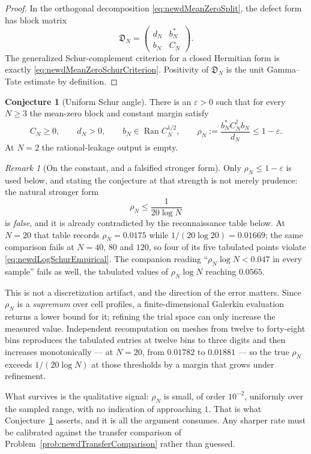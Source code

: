 \documentclass[11pt]{amsart}
\theoremstyle{definition}
\newtheorem{conjecture}[theorem]{Conjecture}
\theoremstyle{remark}
\newtheorem{remark}[theorem]{Remark}
\begin{document}
\begin{proof}
In the orthogonal decomposition \eqref{eq:newdMeanZeroSplit}, the defect
form has block matrix
\[
 \mathfrak D_N=
 \begin{pmatrix}d_N&b_N^*\\ b_N&C_N\end{pmatrix}.
\]
The generalized Schur-complement criterion for a closed Hermitian form is
exactly \eqref{eq:newdMeanZeroSchurCriterion}.  Positivity of
$\mathfrak D_N$ is the unit Gamma--Tate estimate by definition.
\end{proof}

\begin{conjecture}[Uniform Schur angle]
\label{conj:newdLogSchurAngle}
There is an $\varepsilon>0$ such that for every $N\geq3$ the mean-zero block
and constant margin satisfy
\begin{equation}\label{eq:newdLogSchurConjecture}
 C_N\geq0,
 \qquad d_N>0,
 \qquad b_N\in\operatorname{Ran}C_N^{1/2},
 \qquad
 \rho_N:=\frac{b_N^*C_N^\dagger b_N}{d_N}
 \leq1-\varepsilon .
\end{equation}
At $N=2$ the rational-leakage output is empty.
\end{conjecture}

\begin{remark}[On the constant, and a falsified stronger form]
\label{rem:newdConstantCalibration}
Only $\rho_N\le1-\varepsilon$ is used below, and stating the conjecture at
that strength is not merely prudence: the natural stronger form
\begin{equation}\label{eq:newdLogSchurEmpirical}
 \rho_N\le\frac{1}{20\log N}
\end{equation}
is \emph{false}, and it is already contradicted by the reconnaissance table
below.  At $N=20$ that table records $\rho_N=0.0175$ while
$1/(20\log20)=0.01669$; the same comparison fails at $N=40$, $80$ and $120$,
so four of its five tabulated points violate
\eqref{eq:newdLogSchurEmpirical}.  The companion reading
``$\rho_N\log N<0.047$ in every sample'' fails as well, the tabulated values
of $\rho_N\log N$ reaching $0.0565$.

This is not a discretization artifact, and the direction of the error matters.
Since $\rho_N$ is a \emph{supremum} over cell profiles, a finite-dimensional
Galerkin evaluation returns a lower bound for it; refining the trial space can
only increase the measured value.  Independent recomputation on meshes from
twelve to forty-eight bins reproduces the tabulated entries at twelve bins to
three digits and then increases monotonically --- at $N=20$, from $0.01782$ to
$0.01881$ --- so the true $\rho_N$ exceeds $1/(20\log N)$ at those thresholds
by a margin that grows under refinement.

What survives is the qualitative signal: $\rho_N$ is small, of order
$10^{-2}$, uniformly over the sampled range, with no indication of approaching
$1$.  That is what Conjecture~\ref{conj:newdLogSchurAngle} asserts, and it is
all the argument consumes.  Any sharper rate must be calibrated against the
transfer comparison of Problem~\ref{prob:newdTransferComparison} rather than
guessed.
\end{remark}
\end{document}

